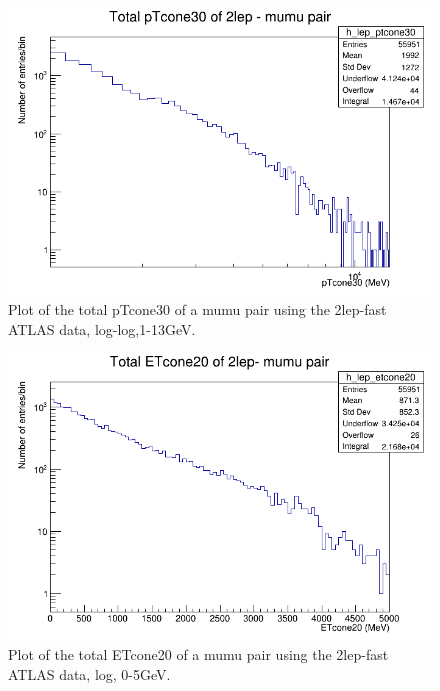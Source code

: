 \begin{figure}[h!]
    \centering
	\includegraphics[width=0.85\linewidth]{plots/16-02-2021/2lep-fast_mumu-pair_ptcone30(total)_log-log_1-13GeV_16-02-2021_11-45.png}
	\caption{Plot of the total pTcone30 of a mumu pair using the 2lep-fast ATLAS data, log-log,1-13GeV. }\label{fig:2lep-fast_mumu-pair_ptcone30(total)_log-log_1-13GeV_16-02-2021_11-45.png}
\end{figure}


\begin{figure}[h!]
    \centering
	\includegraphics[width=0.85\linewidth]{plots/16-02-2021/2lep-fast_mumu-pair_etcone20(total)_log-entries_0-5GeV_16-02-2021_11-31.png}
	\caption{Plot of the total ETcone20 of a mumu pair using the 2lep-fast ATLAS data, log, 0-5GeV. }\label{fig:2lep-fast_mumu-pair_etcone20(total)_log-entries_0-5GeV_16-02-2021_11-31}
\end{figure}

